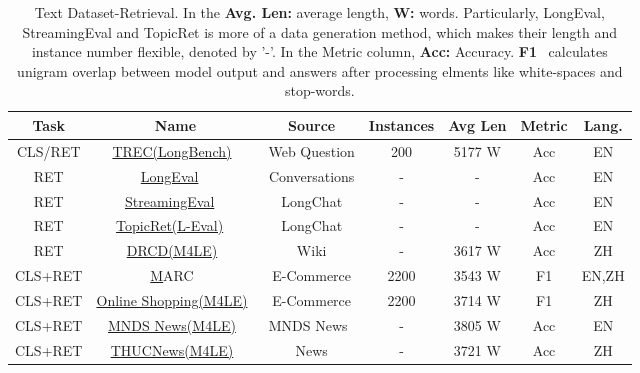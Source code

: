 
\begin{table*}[]
    \centering
    \caption{Text Dataset-Retrieval. In the \textbf{Avg. Len: }  average length, \textbf{W: } words. Particularly, LongEval, StreamingEval and TopicRet is more of a data generation method, which makes their length and instance number flexible, denoted by '-'. In the Metric column, \textbf{Acc:} Accuracy. \textbf{F1}~\cite{rajpurkar-etal-2016-squad-F1} calculates unigram overlap between model output and answers after processing elments like white-spaces and stop-words. }
    \renewcommand{\arraystretch}{1.3} %
    \setlength{\tabcolsep}{1pt} %
    \label{tab:text-dataset-retrieval}
\begin{tabular}{c|c|c|c|c|c|c}
\hline
\textbf{Task} &
  \textbf{Name} &
  \textbf{Source} &
  \textbf{Instances} &
  \textbf{Avg Len} &
  \textbf{Metric} &
  \textbf{Lang.} \\ \hline
CLS/RET &
  \href{https://huggingface.co/datasets/THUDM/LongBench}{TREC(LongBench)}~\cite{bai_longbench:_2023} &
  Web Question &
  200 &
  5177 W &
  Acc &
  EN \\ \hline
RET &
  \href{https://github.com/DachengLi1/LongChat}{LongEval} ~\cite{longchat2023} &
  Conversations&
  - &
  - &
  Acc&
  EN \\ \hline
RET &
  \href{http://arxiv.org/abs/2309.17453}{StreamingEval} ~\cite{DBLP:conf/iclr/XiaoTCHL24} &
  LongChat\cite{longchat2023} &
  -&
  - &
  Acc&
  EN \\ \hline
RET &
  \href{https://github.com/OpenLMLab/LEval}{TopicRet(L-Eval)} ~\cite{an_l-eval:_2023} &
  LongChat\cite{longchat2023} &
  -&
  -&
  Acc&
  EN \\ \hline
RET &
  \href{https://github.com/KwanWaiChung/M4LE}{DRCD(M4LE)}~\cite{kwan_m4le:_2023} &
  Wiki &
  - &
  3617 W&
  Acc &
  ZH \\ \hline
CLS+RET &
  \href{https://github.com/KwanWaiChung/M4LE}MARC~\cite{kwan_m4le:_2023} &
  E-Commerce &
  2200 &
  3543 W&
  F1 &
  EN,ZH \\ \hline
CLS+RET &
  \href{https://github.com/KwanWaiChung/M4LE}{Online Shopping(M4LE)}~\cite{kwan_m4le:_2023} &
  E-Commerce &
  2200 &
  3714 W&
  F1 &
  ZH \\ \hline

CLS+RET &
  \href{https://github.com/KwanWaiChung/M4LE}{MNDS News(M4LE)}~\cite{kwan_m4le:_2023} &
  MNDS News~\cite{petukhova_mn-ds:_2023} &
  - &
  3805 W &
  Acc &
  EN \\ \hline
CLS+RET &
  \href{https://github.com/KwanWaiChung/M4LE}{THUCNews(M4LE)}~\cite{kwan_m4le:_2023} &
  News &
  - &
  3721 W&
  Acc &
  ZH \\ \hline
\end{tabular}
\end{table*}

